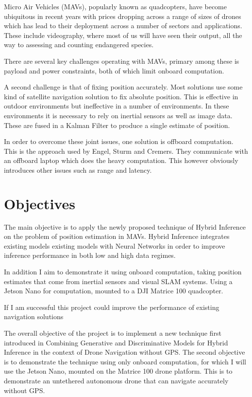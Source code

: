 \documentclass[]{../resources/final_report}
\begin{document}
Micro Air Vehicles (MAVs), popularly known as quadcopters, have become ubiquitous in recent years with prices dropping across a range of sizes of drones 
which has lead to their deployment across a number of sectors and applications. These include 
videography, where most of us will have seen their output, all the way to 
assessing and counting endangered species.

There are several key challenges operating with MAVs,
primary among these is payload and power constraints, both of which limit onboard computation. 

A second challenge is that of fixing position accurately. Most solutions use some kind of 
satellite navigation solution to fix absolute position. This is effective in outdoor environments
but ineffective in a number of environments. In these environments it is necessary to rely on
inertial sensors as well as image data. These are fused in a Kalman Filter to produce a single
estimate of position.

In order to overcome these joint issues, one solution is offboard computation. This is the 
approach used by Engel, Sturm and Cremers. They communicate with an offboard laptop
which does the heavy computation. This however obviously introduces other issues
such as range and latency. 


\section{Objectives}

The main objective is to apply the newly proposed technique of Hybrid Inference \cite{Satorras2019CombiningGA} on the
problem of position estimation in MAVs. Hybrid Inference integrates existing models existing models with Neural Networks
in order to improve inference performance in both low and high data regimes.

In addition I aim to demonstrate it using onboard computation, taking position estimates that come from inertial sensors and visual SLAM systems. Using a Jetson Nano for computation, mounted to a DJI Matrice 100 quadcopter.

If I am successful this project could improve the performance of existing navigation solutions 



The overall objective of the project is to implement a new technique first introduced in Combining Generative and Discriminative Models for Hybrid Inference \cite{Satorras2019CombiningGA} in the context of Drone Navigation without GPS.
The second objective is to demonstrate the technique using only onboard computation, for which I will use the Jetson Nano, mounted on the Matrice 100 drone platform. This is to demonstrate an untethered autonomous drone that can navigate accurately without GPS.
\end{document}
